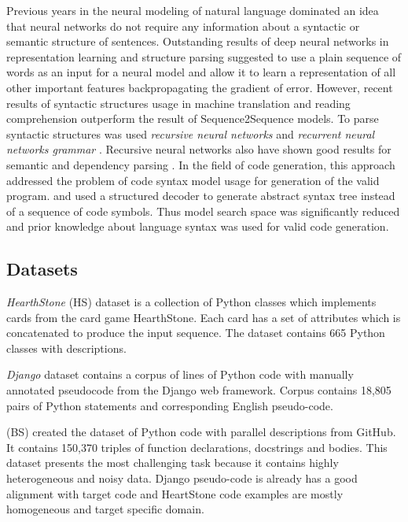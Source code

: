 Previous years in the neural modeling of natural language dominated an idea that neural networks do not require any information about a syntactic or semantic structure of sentences. Outstanding results of deep neural networks in representation learning and structure parsing suggested to use a plain sequence of words as an input for a neural model and allow it to learn a representation of all other important features backpropagating the gradient of error. However, recent results of syntactic structures usage in machine translation \parencite{Chen2017} and reading comprehension \parencite{xie2017constituent} outperform the result of Sequence2Sequence models. To parse syntactic structures was used \emph{recursive neural networks} \parencite{Goller, socher2011parsing} and \emph{recurrent neural networks grammar} \parencite{Dyer2016}. Recursive neural networks also have shown good results for semantic \parencite{Tai2015} and dependency parsing \parencite{Zhu2015}. In the field of code generation, this approach addressed the problem of code syntax model usage for generation of the valid program. \cite{Yin2017} and \cite{Rabinovich2017} used a structured decoder to generate abstract syntax tree instead of a sequence of code symbols. Thus model search space was significantly reduced and prior knowledge about language syntax was used for valid code generation.

\subsection{Datasets}
\emph{HearthStone} (HS) dataset \parencite{Ling2016} is a collection of Python classes which implements cards from the card game HearthStone. Each card has a set of attributes which is concatenated to produce the input sequence. The dataset contains 665 Python classes with descriptions.

\emph{Django} dataset \parencite{Oda2015} contains a corpus of lines of Python code with manually annotated pseudocode from the Django web framework. Corpus contains 18,805 pairs of Python statements and corresponding English pseudo-code. 

\cite{Barone2017} (BS) created the dataset of Python code with parallel descriptions from GitHub. It contains 150,370 triples of function declarations, docstrings and bodies. This dataset presents the most challenging task because it contains highly heterogeneous and noisy data. Django pseudo-code is already has a good alignment with target code and HeartStone code examples are mostly homogeneous and target specific domain.

